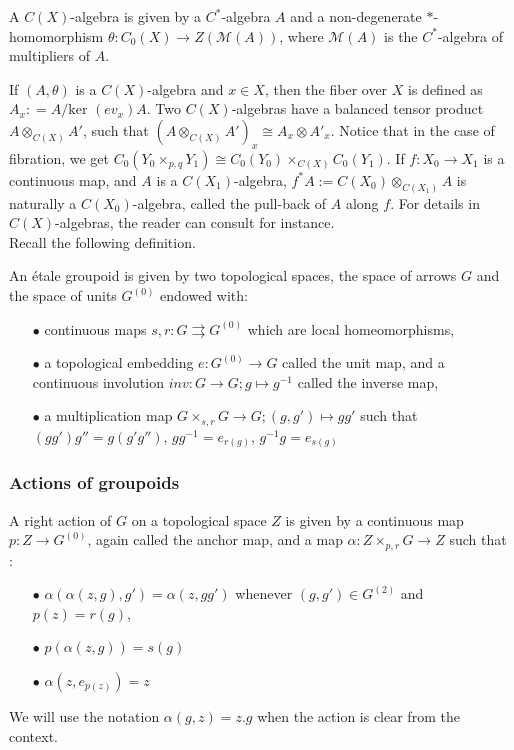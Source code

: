 \begin{definition}
A $C(X)$-algebra is given by a $C^*$-algebra $A$ and a non-degenerate $*$-homomorphism $\theta : C_0(X) \rightarrow Z(\mathcal M(A))$, where $\mathcal M(A)$ is the $C^*$-algebra of multipliers of $A$.
\end{definition}

If $(A,\theta)$ is a $C(X)$-algebra and $x\in X$, then the fiber over $X$ is defined as $A_x : = A/ \text{ker }(ev_x)A$. Two $C(X)$-algebras have a balanced tensor product $A\otimes_{C(X)} A'$, such that $(A\otimes_{C(X)} A')_x \cong A_x\otimes A'_x$. Notice that in the case of fibration, we get $C_0(Y_0\times_{p,q}Y_1) \cong C_0(Y_0)\times_{C(X)}C_0(Y_1)$. If $f:X_0 \rightarrow X_1$ is a continuous map, and $A$ is a $C(X_1)$-algebra, $f^* A :=C(X_0)\otimes_{C(X_1)} A$ is naturally a $C(X_0)$-algebra, called the pull-back of $A$ along $f$. For details in $C(X)$-algebras, the reader can consult \cite{blanchard} for instance. 
\\

Recall the following definition.

\begin{definition}
An étale groupoid is given by two topological spaces, the space of arrows $G$ and the space of units $G^{(0)}$ endowed with:
\begin{itemize}
\item[$\bullet$] continuous maps $s,r : G \rightrightarrows G^{(0)}$ which are local homeomorphisms,
\item[$\bullet$] a topological embedding $e: G^{(0)}\rightarrow G$ called the unit map, and a continuous involution $inv : G\rightarrow G; g\mapsto g^{-1}$ called the inverse map,
\item[$\bullet$] a multiplication map $G\times_{s,r}G\rightarrow G; (g,g')\mapsto gg'$ such that $(gg')g'' = g(g'g'')$, $gg^{-1}= e_{r(g)}$, $g^{-1}g= e_{s(g)}$
\end{itemize}
\end{definition}

\subsubsection{Actions of groupoids}

\begin{definition}
A right action of $G$ on a topological space $Z$ is given by a continuous map $p : Z \rightarrow G^{(0)}$, again called the anchor map, and a map $\alpha : Z\times_{p,r} G \rightarrow Z $ such that :
\begin{itemize}
\item[$\bullet$] $\alpha(\alpha(z,g),g') = \alpha(z, gg')$ whenever $(g,g')\in G^{(2)}$ and $p(z)=r(g)$,
\item[$\bullet$] $p(\alpha(z,g))= s(g)$
\item[$\bullet$] $\alpha(z,e_{p(z)})=z$
\end{itemize} We will use the notation $\alpha(g,z) = z.g$ when the action is clear from the context.\\ 
\end{definition}

